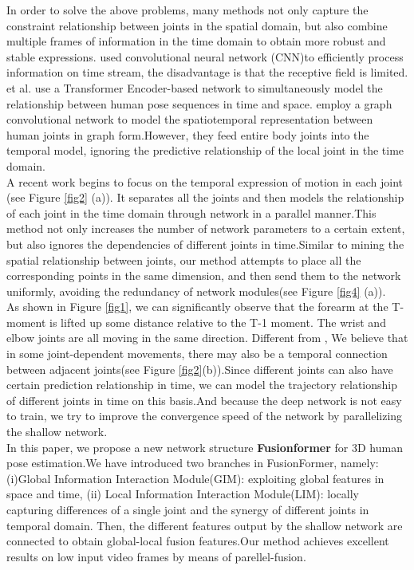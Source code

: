 \documentclass{article}
\begin{document}
\noindent In order to solve the above problems, many methods not only capture the constraint relationship between joints in the spatial domain, but also combine multiple frames of information in the time domain to obtain more robust and stable expressions. \cite{pavllo20193d} used convolutional neural network (CNN)to efficiently process information on time stream, the disadvantage is that the receptive field is limited. \cite{zheng20213d} et al. use a Transformer Encoder-based network to simultaneously model the relationship between human pose sequences in time and space. \cite{cai2019exploiting,Hu2021ConditionalDG} employ a graph convolutional network to model the spatiotemporal representation between human joints in graph form.However, they feed entire body joints into the temporal model, ignoring the predictive relationship of the local joint in the time domain.\\
A recent work \cite{zhang2022mixste} begins to focus on the temporal expression of motion in each joint (see Figure \ref{fig2} (a)). It separates all the joints and then models the relationship of each joint in the time domain through  network in a parallel manner.This method not only increases the number of network parameters to a certain extent, but also ignores the dependencies of different joints in time.Similar to mining the spatial relationship between joints, our method attempts to place all the corresponding points  in the same dimension, and then send them to the network uniformly, avoiding the redundancy of network modules(see Figure \ref{fig4} (a)).\\
As shown in Figure \ref{fig1}, we can significantly observe that the forearm at the T-moment is lifted up some distance relative to the T-1 moment. The wrist and elbow joints are all moving in the same direction. Different from \cite{zhang2022mixste}, We believe that in some joint-dependent movements, there may also be a temporal connection between adjacent joints(see Figure \ref{fig2}(b)).Since different joints can also have certain prediction relationship in time, we can model the trajectory relationship of different joints in time on this basis.And because the deep network is not easy to train, we try to improve the convergence speed of the network by parallelizing the shallow network.\\
In this paper, we propose a new network structure \textbf{Fusionformer} for 3D human pose estimation.We have introduced two branches in FusionFormer, namely: (i)Global Information Interaction Module(GIM): exploiting global features in space and time, (ii) Local Information Interaction Module(LIM): locally capturing  differences of a single joint and the synergy of different joints in temporal domain. Then, the different features output by the shallow network are connected to obtain global-local fusion features.Our method achieves excellent results on low input video frames by means of parellel-fusion.\\
\end{document}
